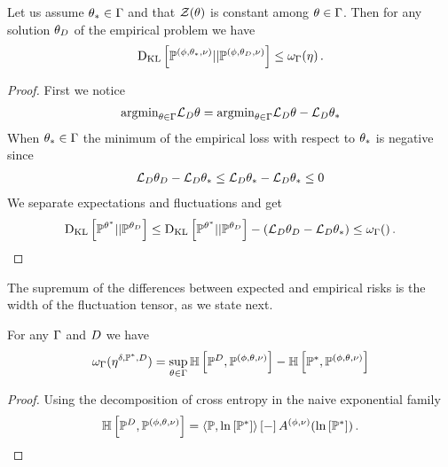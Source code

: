\begin{theorem}
    Let us assume $\theta_{*}\in\Gamma$ and that $\mathcal{Z}{\left(\theta\right)}$ is constant among $\theta\in\Gamma$.
    Then for any solution $\theta_{D}$ of the empirical problem we have
    \begin{align}
        \mathrm{D}_{\mathrm{KL}}\left[ \mathbb{P}^{(\phi,\theta_{*},\nu)} || \mathbb{P}^{(\phi,\theta_{D},\nu)} \right] \leq \omega_{\Gamma}(\eta) \, .
    \end{align}
\end{theorem}
\begin{proof}
    First we notice
    \begin{align}
        \mathrm{argmin}_{\theta\in\Gamma} \mathcal{L}_{D}\theta = \mathrm{argmin}_{\theta\in\Gamma} \mathcal{L}_{D}\theta - \mathcal{L}_{D}\theta_{*}
    \end{align}
    When $\theta_{*}\in\Gamma$ the minimum of the empirical loss with respect to $\theta_{*}$ is negative since
    \begin{align}
        \mathcal{L}_{D}\theta_{D} - \mathcal{L}_{D}\theta_{*} \leq \mathcal{L}_{D}\theta_{*}-\mathcal{L}_{D}\theta_{*} \leq 0
    \end{align}
    We separate expectations and fluctuations and get
    \begin{align}
        \mathrm{D}_{\mathrm{KL}}\left[ \mathbb{P}^{\theta^*} || \mathbb{P}^{\theta_{D}} \right] \leq \mathrm{D}_{\mathrm{KL}}\left[ \mathbb{P}^{\theta^*} || \mathbb{P}^{\theta_{D}} \right] - (\mathcal{L}_{D}\theta_{D} - \mathcal{L}_{D}\theta_{*}) \leq \omega_{\Gamma}() \, .
    \end{align}
\end{proof}

The supremum of the differences between expected and empirical risks is the width of the fluctuation tensor, as we state next.

\begin{lemma}
    For any $\Gamma$ and $D$ we have
    \begin{align*}
        \omega_{\Gamma}(\eta^{\delta,\mathbb{P}^*,D})
        = \sup_{\theta\in\Gamma} \mathbb{H}\left[\mathbb{P}^{D},\mathbb{P}^{(\phi,\theta,\nu)}\right] - \mathbb{H}\left[\mathbb{P}^*,\mathbb{P}^{(\phi,\theta,\nu)}\right]
    \end{align*}
\end{lemma}
\begin{proof}
    Using the decomposition of cross entropy in the naive exponential family
    \[ \mathbb{H}\left[\mathbb{P}^{D},\mathbb{P}^{(\phi,\theta,\nu)}\right]=\left\langle \mathbb{P},\ln \left[ \mathbb{P}^* \right]\right\rangle \left[ - \right] A^{(\phi,\nu)}(\ln \left[ \mathbb{P}^* \right]) \, . \]
\end{proof}


